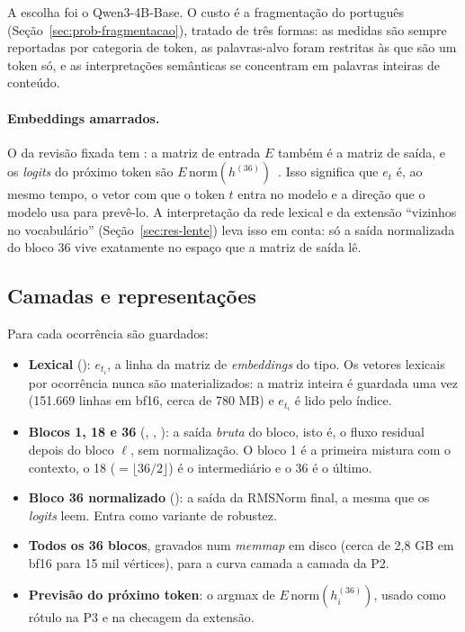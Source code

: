A escolha foi o Qwen3-4B-Base. O custo é a fragmentação do português
(Seção~\ref{sec:prob-fragmentacao}), tratado de três formas: as medidas são sempre reportadas
por categoria de token, as palavras-alvo foram restritas às que são um token só, e as
interpretações semânticas se concentram em palavras inteiras de conteúdo.

\paragraph{Embeddings amarrados.} O  da revisão fixada tem
: a matriz de entrada $E$ também é a matriz de saída, e os
\emph{logits} do próximo token são $E\,\mathrm{norm}(h^{(36)})$~\cite{press2017}. Isso
significa que $e_t$ é, ao mesmo tempo, o vetor com que o token $t$ entra no modelo e a direção
que o modelo usa para prevê-lo. A interpretação da rede lexical e da extensão ``vizinhos no
vocabulário'' (Seção~\ref{sec:res-lente}) leva isso em conta: só a saída normalizada do bloco
36 vive exatamente no espaço que a matriz de saída lê.

\subsection{Camadas e representações}

Para cada ocorrência são guardados:
\begin{itemize}
    \item \textbf{Lexical} (): $e_{t_i}$, a linha da matriz de \emph{embeddings} do
    tipo. Os vetores lexicais por ocorrência nunca são materializados: a matriz inteira é
    guardada uma vez (151.669 linhas em bf16, cerca de 780 MB) e $e_{t_i}$ é lido pelo índice.
    \item \textbf{Blocos 1, 18 e 36} (, , ): a saída \emph{bruta}
    do bloco, isto é, o fluxo residual depois do bloco $\ell$, sem normalização. O bloco 1 é a
    primeira mistura com o contexto, o 18 ($=\lfloor 36/2\rfloor$) é o intermediário e o 36 é
    o último.
    \item \textbf{Bloco 36 normalizado} (): a saída da RMSNorm final, a mesma que os
    \emph{logits} leem. Entra como variante de robustez.
    \item \textbf{Todos os 36 blocos}, gravados num \emph{memmap} em disco (cerca de 2,8 GB
    em bf16 para 15 mil vértices), para a curva camada a camada da P2.
    \item \textbf{Previsão do próximo token}: o argmax de $E\,\mathrm{norm}(h^{(36)}_i)$, usado
    como rótulo na P3 e na checagem da extensão.
\end{itemize}

